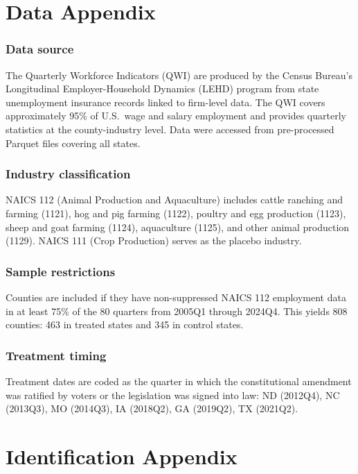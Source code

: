 \documentclass[12pt]{article}
\begin{document}
\section{Data Appendix}

\subsubsection*{Data source} The Quarterly Workforce Indicators (QWI) are produced by the Census Bureau's Longitudinal Employer-Household Dynamics (LEHD) program from state unemployment insurance records linked to firm-level data. The QWI covers approximately 95\% of U.S.\ wage and salary employment and provides quarterly statistics at the county-industry level. Data were accessed from pre-processed Parquet files covering all states.

\subsubsection*{Industry classification} NAICS 112 (Animal Production and Aquaculture) includes cattle ranching and farming (1121), hog and pig farming (1122), poultry and egg production (1123), sheep and goat farming (1124), aquaculture (1125), and other animal production (1129). NAICS 111 (Crop Production) serves as the placebo industry.

\subsubsection*{Sample restrictions} Counties are included if they have non-suppressed NAICS 112 employment data in at least 75\% of the 80 quarters from 2005Q1 through 2024Q4. This yields 808 counties: 463 in treated states and 345 in control states.

\subsubsection*{Treatment timing} Treatment dates are coded as the quarter in which the constitutional amendment was ratified by voters or the legislation was signed into law: ND (2012Q4), NC (2013Q3), MO (2014Q3), IA (2018Q2), GA (2019Q2), TX (2021Q2).

\section{Identification Appendix}
\end{document}
